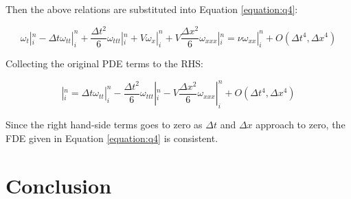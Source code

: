 \documentclass[letterpaper,12pt]{article}
\begin{document}
Then the above relations are substituted into Equation \ref{equation:q4}:

\begin{equation}
	\omega_t|^n_i - \Delta t \omega_{tt}|^n_i + \frac{\Delta t^2}{6} \omega_{ttt}|^n_i + V\omega_x|^n_i + V\frac{\Delta x^2}{6}\omega_{xxx}|^n_i = \nu\omega_{xx}|^n_i + O(\Delta t^4,\Delta x^4)
\end{equation}

Collecting the original PDE terms to the RHS:

\begin{equation}
	[\omega_t + V\omega_x - \nu\omega_{xx}]|^n_i = \Delta t \omega_{tt}|^n_i - \frac{\Delta t^2}{6} \omega_{ttt}|^n_i - V\frac{\Delta x^2}{6}\omega_{xxx}|^n_i + O(\Delta t^4,\Delta x^4)
\end{equation}

Since the right hand-side terms goes to zero as $\Delta t$ and $\Delta x$ approach to zero, the FDE given
in Equation \ref{equation:q4} is consistent.

\section{Conclusion}
\end{document}
